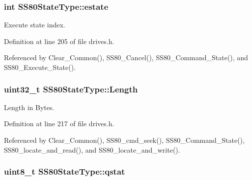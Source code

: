 \subsubsection[{\texorpdfstring{estate}{estate}}]{\setlength{\rightskip}{0pt plus 5cm}int S\+S80\+State\+Type\+::estate}\hypertarget{structSS80StateType_ae4a94143cb4201687be4e33684be057e}{}\label{structSS80StateType_ae4a94143cb4201687be4e33684be057e}


Execute state index. 



Definition at line 205 of file drives.\+h.



Referenced by Clear\+\_\+\+Common(), S\+S80\+\_\+\+Cancel(), S\+S80\+\_\+\+Command\+\_\+\+State(), and S\+S80\+\_\+\+Execute\+\_\+\+State().

\subsubsection[{\texorpdfstring{Length}{Length}}]{\setlength{\rightskip}{0pt plus 5cm}uint32\+\_\+t S\+S80\+State\+Type\+::\+Length}\hypertarget{structSS80StateType_a507159f0a0a4f3127488081fd618e8f6}{}\label{structSS80StateType_a507159f0a0a4f3127488081fd618e8f6}


Length in Bytes. 



Definition at line 217 of file drives.\+h.



Referenced by Clear\+\_\+\+Common(), S\+S80\+\_\+cmd\+\_\+seek(), S\+S80\+\_\+\+Command\+\_\+\+State(), S\+S80\+\_\+locate\+\_\+and\+\_\+read(), and S\+S80\+\_\+locate\+\_\+and\+\_\+write().

\subsubsection[{\texorpdfstring{qstat}{qstat}}]{\setlength{\rightskip}{0pt plus 5cm}uint8\+\_\+t S\+S80\+State\+Type\+::qstat}\hypertarget{structSS80StateType_ad4911c7b89ec1ff2c0aa01881b1e3d3a}{}\label{structSS80StateType_ad4911c7b89ec1ff2c0aa01881b1e3d3a}


